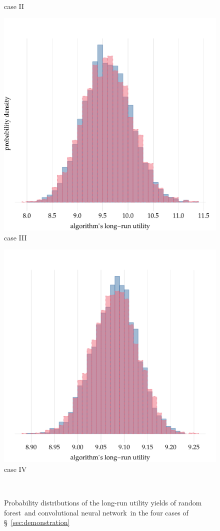 \documentclass[\ifafour a4paper,12pt,\else a5paper,10pt,\fi%
onecolumn,oneside,article,%
british%
]{memoir}
\theoremstyle{remark}
\theoremstyle{innote}
\renewcommand*{\|}[1][]{\nonscript\:#1\vert\nonscript\:\mathopen{}}
\newcommand*{\sect}{\S}%
\newcommand*{\RF}{random forest}
\newcommand*{\CNN}{convolutional neural network}
\begin{document}
\begin{figure}[!p]
{    \\\footnotesize case II}
  \\[\jot]
  \parbox{0.495\linewidth}{\centering
    \includegraphics[width=\linewidth]{histogram_alg_utilities_3.pdf}
  \\\footnotesize case III}%
  \hfill
  \parbox{0.495\linewidth}{\centering
    \includegraphics[width=\linewidth]{histogram_alg_utilities_4.pdf}
  \\\footnotesize case IV}
\\
  \caption{Probability distributions of the long-run utility yields of \RF\ and \CNN\ in the four cases of \sect~\ref{sec:demonstration}}
  \label{fig:algorithms_utilities_histograms}
\end{figure}
\end{document}

